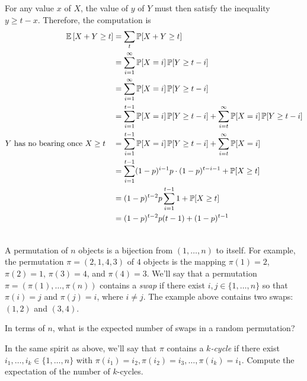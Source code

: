 \documentclass[11pt]{article}
\begin{document}
\begin{solution}
\begin{Parts}
\Part For any value $x$ of $X$, the value of $y$ of $Y$ must then satisfy the
inequality $y \geq t - x$. Therefore, the computation is
\[
    \begin{split}
        \operatorname{\mathbb{E}}\left[X + Y \geq t\right] &= \sum_t \operatorname{\mathbb{P}}[X + Y \geq t] \\
        &= \sum_{i=1}^{\infty} \operatorname{\mathbb{P}}[X =i] \operatorname{\mathbb{P}}[Y \geq t - i] \\
        &= \sum_{i=1}^{\infty} \operatorname{\mathbb{P}}[X =i] \operatorname{\mathbb{P}}[Y \geq t - i] \\
        &= \sum_{i=1}^{t-1} \operatorname{\mathbb{P}}[X =i] \operatorname{\mathbb{P}}[Y \geq t - i] + \sum_{i=t}^{\infty} \operatorname{\mathbb{P}}[X =i] \operatorname{\mathbb{P}}[Y \geq t - i] \\
        \text{$Y$ has no bearing once $X\geq t$} \quad &= \sum_{i=1}^{t-1} \operatorname{\mathbb{P}}[X =i] \operatorname{\mathbb{P}}[Y \geq t - i] + \sum_{i=t}^{\infty} \operatorname{\mathbb{P}}[X =i] \\
        &= \sum_{i=1}^{t-1} (1-p)^{i-1}p \cdot (1-p)^{t-i-1} + \operatorname{\mathbb{P}}[X \geq t] \\\
        &= (1-p)^{t-2}p \sum_{i=1}^{t-1} 1 + \operatorname{\mathbb{P}}[X \geq t] \\\
        &= (1-p)^{t-2}p (t-1)+ (1-p)^{t-1} \\\
    \end{split}
\]

\end{Parts}

\end{solution}

A permutation of $n$ objects is a bijection from $(1,\ldots,n)$ to itself. For 
example, the permutation $\pi=(2,1,4,3)$ of $4$ objects is the mapping $\pi(1) 
= 2$, $\pi(2) = 1$, $\pi(3) = 4$, and $\pi(4) = 3$. We'll say that a permutation 
$\pi = (\pi(1),\ldots,\pi(n))$ contains a \emph{swap} if there exist 
$i,j\in\{1,\ldots,n\}$ so that $\pi(i) = j$ and $\pi(j) = i$, where $i \neq j$. 
The example above contains two swaps: $(1,2)$ and $(3,4)$.

\begin{Parts}
	\Part In terms of $n$, what is the expected number of swaps in a random 
    permutation?
	
	\Part In the same spirit as above, we'll say that $\pi$ contains a 
    \emph{$k$-cycle} if there exist $i_1,\ldots,i_k \in \{1,\ldots,n\}$ with 
    $\pi(i_1) = i_2,\pi(i_2) = i_3,\ldots,\pi(i_k) = i_1$. Compute the 
    expectation of the number of $k$-cycles. 	
\end{Parts}
\end{document}
